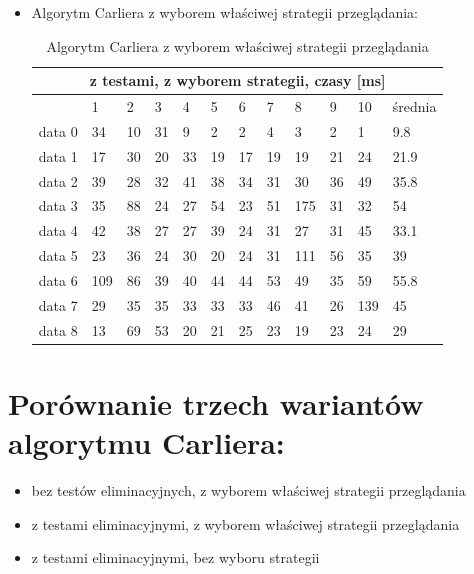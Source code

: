 \documentclass[11pt]{article}
\begin{document}
\begin{itemize}
\item Algorytm Carliera z wyborem właściwej strategii przeglądania:\\
\begin{table}[!ht]
\centering
\label{my-label}
\begin{tabular}{|l|l|l|l|l|l|l|l|l|l|l|l|}
\hline
\multicolumn{12}{|c|}{z testami, z wyborem strategii, czasy {[}ms{]}}       \\ \hline
       & 1   & 2  & 3  & 4  & 5  & 6  & 7  & 8   & 9  & 10  & średnia \\ \hline
data 0 & 34  & 10 & 31 & 9  & 2  & 2  & 4  & 3   & 2  & 1   & 9.8     \\ \hline
data 1 & 17  & 30 & 20 & 33 & 19 & 17 & 19 & 19  & 21 & 24  & 21.9    \\ \hline
data 2 & 39  & 28 & 32 & 41 & 38 & 34 & 31 & 30  & 36 & 49  & 35.8    \\ \hline
data 3 & 35  & 88 & 24 & 27 & 54 & 23 & 51 & 175 & 31 & 32  & 54      \\ \hline
data 4 & 42  & 38 & 27 & 27 & 39 & 24 & 31 & 27  & 31 & 45  & 33.1    \\ \hline
data 5 & 23  & 36 & 24 & 30 & 20 & 24 & 31 & 111 & 56 & 35  & 39      \\ \hline
data 6 & 109 & 86 & 39 & 40 & 44 & 44 & 53 & 49  & 35 & 59  & 55.8    \\ \hline
data 7 & 29  & 35 & 35 & 33 & 33 & 33 & 46 & 41  & 26 & 139 & 45      \\ \hline
data 8 & 13  & 69 & 53 & 20 & 21 & 25 & 23 & 19  & 23 & 24  & 29      \\ \hline
\end{tabular}
\caption {Algorytm Carliera z wyborem właściwej strategii przeglądania}
\end{table}
\end{itemize}


\section{Porównanie trzech wariantów algorytmu Carliera:} 
\begin{itemize}
\item bez testów eliminacyjnych, z wyborem właściwej strategii przeglądania
\item z testami eliminacyjnymi, z wyborem właściwej strategii przeglądania
\item z testami eliminacyjnymi, bez wyboru strategii

\end{itemize}
\end{document}

